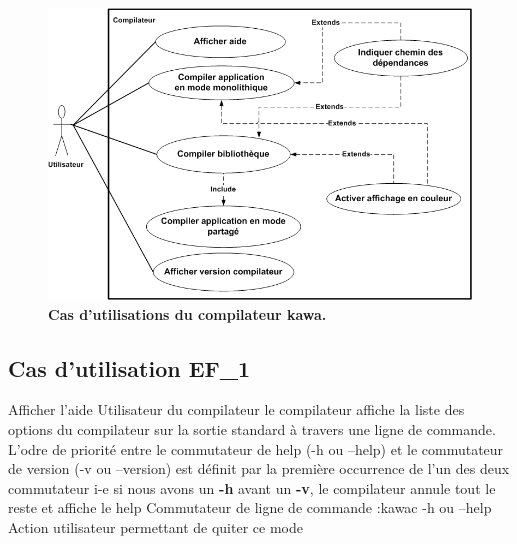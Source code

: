 \begin{figure}
  \centering
  \includegraphics[scale=0.8]{../res/stb/vs_finale_usecase.jpg}
  \caption{\textbf{Cas d'utilisations du compilateur kawa.}}
\end{figure}

\subsection{Cas d'utilisation EF\_1}
\fiche
{Afficher l'aide}                    %
{Utilisateur du compilateur}                               %
{                                                %
  le compilateur affiche 
   la liste des options du compilateur sur la sortie standard à travers une ligne de commande.
}
{
  L'odre de priorité entre le commutateur de help (-h ou --help) et le commutateur de version (-v ou --version) est définit par la première occurrence de l'un des deux commutateur i-e si nous avons un \textbf {-h} avant un \textbf {-v}, le compilateur annule tout le reste et affiche le help 
}                                                %
{Commutateur de ligne de commande :kawac -h ou --help}                             %
{Action utilisateur permettant de quiter ce mode }                       %
{} %
{} %
{} %


